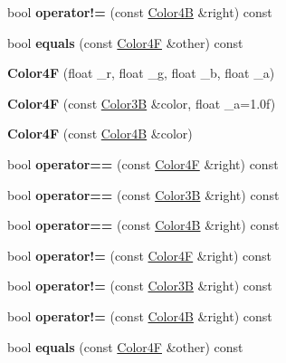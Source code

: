 \begin{DoxyCompactItemize}
bool {\bfseries operator!=} (const \hyperlink{structColor4B}{Color4B} \&right) const
\item 
\mbox{\label{structColor4F_a880baed3fa2dcea11558c3570de23781}} 
bool {\bfseries equals} (const \hyperlink{structColor4F}{Color4F} \&other) const
\item 
\mbox{\label{structColor4F_ada58d58832ce18a74cd55911a09c90e4}} 
{\bfseries Color4F} (float \+\_\+r, float \+\_\+g, float \+\_\+b, float \+\_\+a)
\item 
\mbox{\label{structColor4F_a951f12769d6e0d0045a502db80d8ac7d}} 
{\bfseries Color4F} (const \hyperlink{structColor3B}{Color3B} \&color, float \+\_\+a=1.\+0f)
\item 
\mbox{\label{structColor4F_ac3a19273f9abf17e1bfbc17be59a2e35}} 
{\bfseries Color4F} (const \hyperlink{structColor4B}{Color4B} \&color)
\item 
\mbox{\label{structColor4F_a9ec9a5e6420e0f62c6728d9701ba1300}} 
bool {\bfseries operator==} (const \hyperlink{structColor4F}{Color4F} \&right) const
\item 
\mbox{\label{structColor4F_adeb317ce3c66b6a5e81ac56493169a11}} 
bool {\bfseries operator==} (const \hyperlink{structColor3B}{Color3B} \&right) const
\item 
\mbox{\label{structColor4F_a641244497cf2954d0ac6d7955c730561}} 
bool {\bfseries operator==} (const \hyperlink{structColor4B}{Color4B} \&right) const
\item 
\mbox{\label{structColor4F_a5efe5fd20158f257199ce96ba5e9bc4f}} 
bool {\bfseries operator!=} (const \hyperlink{structColor4F}{Color4F} \&right) const
\item 
\mbox{\label{structColor4F_aa1e5d0657931a7ad4f2b3ed09effe05e}} 
bool {\bfseries operator!=} (const \hyperlink{structColor3B}{Color3B} \&right) const
\item 
\mbox{\label{structColor4F_aba168a25e31e6cb760e92ff2ef354175}} 
bool {\bfseries operator!=} (const \hyperlink{structColor4B}{Color4B} \&right) const
\item 
\mbox{\label{structColor4F_a880baed3fa2dcea11558c3570de23781}} 
bool {\bfseries equals} (const \hyperlink{structColor4F}{Color4F} \&other) const
\end{DoxyCompactItemize}
